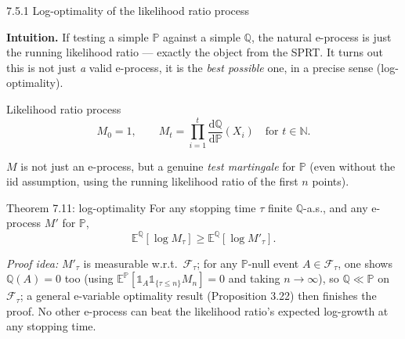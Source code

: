 \documentclass[aspectratio=169,10pt]{beamer}
\newcommand{\Nmb}{\mathbb{N}}
\begin{document}
\begin{frame}[allowframebreaks]{7.5.1 Log-optimality of the likelihood ratio process}

\textbf{Intuition.} If testing a simple $\mathbb P$ against a simple $\mathbb Q$, the natural e-process is just the
running likelihood ratio --- exactly the object from the SPRT. It turns out this is not just \emph{a} valid
e-process, it is the \emph{best possible} one, in a precise sense (log-optimality).

\begin{block}{Likelihood ratio process}
\begin{equation}
M_0 = 1, \qquad M_t = \prod_{i=1}^t \frac{\mathrm d\mathbb Q}{\mathrm d\mathbb P}(X_i) \quad \text{for } t\in\Nmb.
\tag{7.5}
\end{equation}
\end{block}
$M$ is not just an e-process, but a genuine \emph{test martingale} for $\mathbb P$ (even without the iid
assumption, using the running likelihood ratio of the first $n$ points).

\begin{block}{Theorem 7.11: log-optimality}
For any stopping time $\tau$ finite $\mathbb Q$-a.s., and any e-process $M'$ for $\mathbb P$,
\begin{equation}
\mathbb{E}^{\mathbb Q}[\log M_\tau] \ge \mathbb{E}^{\mathbb Q}[\log M'_\tau].
\tag{7.7}
\end{equation}
\end{block}

\framebreak

\emph{Proof idea:} $M'_\tau$ is measurable w.r.t.\ $\mathcal F_\tau$; for any $\mathbb P$-null event $A \in \mathcal
F_\tau$, one shows $\mathbb Q(A)=0$ too (using $\mathbb E^{\mathbb P}[\mathbb 1_A \mathbb 1_{\{\tau\le n\}} M_n]=0$
and taking $n\to\infty$), so $\mathbb Q \ll \mathbb P$ on $\mathcal F_\tau$; a general e-variable optimality result
(Proposition 3.22) then finishes the proof. No other e-process can beat the likelihood ratio's expected log-growth
at any stopping time.

\end{frame}
\end{document}
